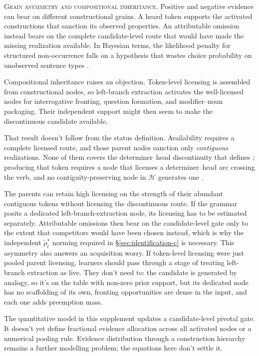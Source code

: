 \noindent\textsc{Grain asymmetry and compositional inheritance.} Positive and
negative evidence can bear on different constructional grains. A heard token
supports the activated constructions that sanction its observed properties.
An attributable omission instead bears on the complete candidate-level route
that would have made the missing realization available. In Bayesian terms, the
likelihood penalty for structured non-occurrence falls on a hypothesis that
wastes choice probability on unobserved sentence types
\autocite{PerforsEtAl2011}.

Compositional inheritance raises an objection. Token-level licensing is assembled from
constructional nodes, so left-branch extraction activates the well-licensed
nodes for interrogative fronting, question formation, and modifier--noun
packaging. Their independent support might then seem to make the discontinuous
candidate available.

That result doesn't follow from the status definition. Availability requires a
complete licensed route, and those parent nodes sanction only \emph{contiguous}
realizations. None of them covers the
determiner--head discontinuity that defines
; producing that token requires a node
that licenses a determiner--head arc crossing the verb, and no
contiguity-preserving node in $\mathcal{H}$ generates one
\autocite{reynolds2026lbe}.

The parents can retain high licensing on the strength of their abundant
contiguous tokens without licensing the discontinuous route. If the grammar
posits a dedicated left-branch-extraction node, its licensing has to be
estimated separately. Attributable omissions then bear on the candidate-level
gate only to the extent that competitors would have been chosen instead, which
is why the independent $\widetilde{\rho}_t^\star$ norming required in
\S\ref{sec:identification-c} is necessary.
This asymmetry also answers an acquisition worry. If token-level licensing were
just pooled parent licensing, learners should pass through a stage of treating
left-branch extraction as live. They don't need to: the candidate is generated
by analogy, so it's on the table with non-zero prior support, but its dedicated
node has no scaffolding of its own, fronting opportunities are dense in the
input, and each one adds preemption mass.

The quantitative model in this supplement updates a candidate-level pivotal
gate. It doesn't yet define fractional evidence allocation across all activated
nodes or a numerical pooling rule. Evidence distribution through a construction
hierarchy remains a further modelling problem; the equations here don't settle it.

